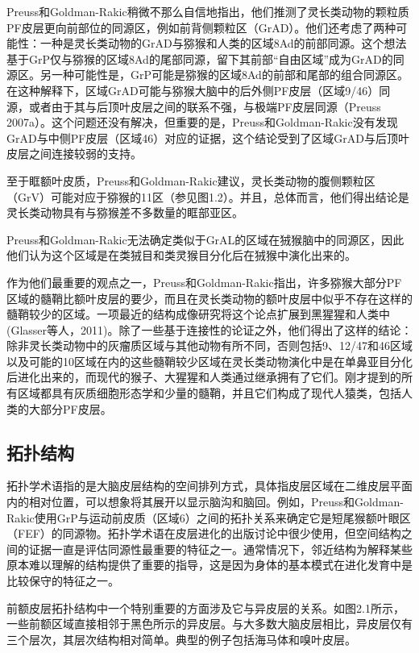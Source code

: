 Preuss和Goldman-Rakic稍微不那么自信地指出，他们推测了灵长类动物的颗粒质PF皮层更向前部位的同源区，例如前背侧颗粒区（GrAD）。他们还考虑了两种可能性：一种是灵长类动物的GrAD与猕猴和人类的区域8Ad的前部同源。这个想法基于GrP仅与猕猴的区域8Ad的尾部同源，留下其前部“自由区域”成为GrAD的同源区。另一种可能性是，GrP可能是猕猴的区域8Ad的前部和尾部的组合同源区。在这种解释下，区域GrAD可能与猕猴大脑中的后外侧PF皮层（区域9/46）同源，或者由于其与后顶叶皮层之间的联系不强，与极端PF皮层同源（Preuss 2007a）。这个问题还没有解决，但重要的是，Preuss和Goldman-Rakic没有发现GrAD与中侧PF皮层（区域46）对应的证据，这个结论受到了区域GrAD与后顶叶皮层之间连接较弱的支持。

至于眶额叶皮质，Preuss和Goldman-Rakic建议，灵长类动物的腹侧颗粒区（GrV）可能对应于猕猴的11区（参见图1.2）。并且，总体而言，他们得出结论是灵长类动物具有与猕猴差不多数量的眶部亚区。

Preuss和Goldman-Rakic无法确定类似于GrAL的区域在狨猴脑中的同源区，因此他们认为这个区域是在类狨目和类灵猴目分化后在狨猴中演化出来的。

作为他们最重要的观点之一，Preuss和Goldman-Rakic指出，许多猕猴大部分PF区域的髓鞘比额叶皮层的要少，而且在灵长类动物的额叶皮层中似乎不存在这样的髓鞘较少的区域。一项最近的结构成像研究将这个论点扩展到黑猩猩和人类中(Glasser等人，2011)。除了一些基于连接性的论证之外，他们得出了这样的结论：除非灵长类动物中的灰瘤质区域与其他动物有所不同，否则包括9、12/47和46区域以及可能的10区域在内的这些髓鞘较少区域在灵长类动物演化中是在单鼻亚目分化后进化出来的，而现代的猴子、大猩猩和人类通过继承拥有了它们。刚才提到的所有区域都具有灰质细胞形态学和少量的髓鞘，并且它们构成了现代人猿类，包括人类的大部分PF皮层。

\subsection{拓扑结构}
拓扑学术语指的是大脑皮层结构的空间排列方式，具体指皮层区域在二维皮层平面内的相对位置，可以想象将其展开以显示脑沟和脑回。例如，Preuss和Goldman-Rakic使用GrP与运动前皮质（区域6）之间的拓扑关系来确定它是短尾猴额叶眼区（FEF）的同源物。拓扑学术语在皮层进化的出版讨论中很少使用，但空间结构之间的证据一直是评估同源性最重要的特征之一。通常情况下，邻近结构为解释某些原本难以理解的结构提供了重要的指导，这是因为身体的基本模式在进化发育中是比较保守的特征之一。

前额皮层拓扑结构中一个特别重要的方面涉及它与异皮层的关系。如图2.1所示，一些前额区域直接相邻于黑色所示的异皮层。与大多数大脑皮层相比，异皮层仅有三个层次，其层次结构相对简单。典型的例子包括海马体和嗅叶皮层。

